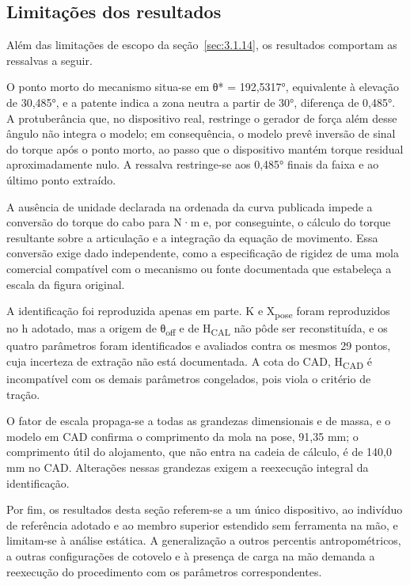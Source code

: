 \subsection{Limitações dos resultados}\label{sec:4.1.9}

Além das limitações de escopo da seção~\ref{sec:3.1.14}, os resultados comportam as ressalvas a seguir.

O ponto morto do mecanismo situa-se em θ* = 192,5317°, equivalente à elevação de 30,485°, e a patente indica a zona neutra a partir de 30°, diferença de 0,485°. A protuberância que, no dispositivo real, restringe o gerador de força além desse ângulo não integra o modelo; em consequência, o modelo prevê inversão de sinal do torque após o ponto morto, ao passo que o dispositivo mantém torque residual aproximadamente nulo. A ressalva restringe-se aos 0,485° finais da faixa e ao último ponto extraído.

A ausência de unidade declarada na ordenada da curva publicada impede a conversão do torque do cabo para N·m e, por conseguinte, o cálculo do torque resultante sobre a articulação e a integração da equação de movimento. Essa conversão exige dado independente, como a especificação de rigidez de uma mola comercial compatível com o mecanismo ou fonte documentada que estabeleça a escala da figura original.

A identificação foi reproduzida apenas em parte. K e X\textsubscript{pose} foram reproduzidos no h adotado, mas a origem de θ\textsubscript{off} e de H\textsubscript{CAL} não pôde ser reconstituída, e os quatro parâmetros foram identificados e avaliados contra os mesmos 29 pontos, cuja incerteza de extração não está documentada. A cota do CAD, H\textsubscript{CAD} é incompatível com os demais parâmetros congelados, pois viola o critério de tração.

O fator de escala propaga-se a todas as grandezas dimensionais e de massa, e o modelo em CAD confirma o comprimento da mola na pose, 91,35 mm; o comprimento útil do alojamento, que não entra na cadeia de cálculo, é de 140,0 mm no CAD. Alterações nessas grandezas exigem a reexecução integral da identificação.

Por fim, os resultados desta seção referem-se a um único dispositivo, ao indivíduo de referência adotado e ao membro superior estendido sem ferramenta na mão, e limitam-se à análise estática. A generalização a outros percentis antropométricos, a outras configurações de cotovelo e à presença de carga na mão demanda a reexecução do procedimento com os parâmetros correspondentes.

